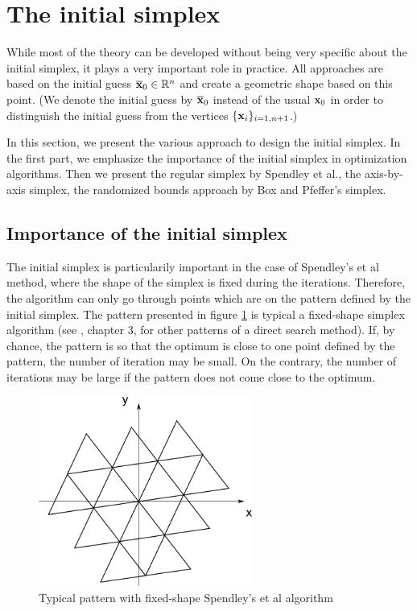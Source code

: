 \section{The initial simplex}

While most of the theory can be developed without being very specific 
about the initial simplex, it plays a very important role in practice.
All approaches are based on the initial guess $\overline{\mathbf{x}}_0\in\mathbb{R}^n$ and create a 
geometric shape based on this point.
(We denote the initial guess by $\overline{\mathbf{x}}_0$ instead of the usual $\mathbf{x}_0$
in order to distinguish the initial guess from the vertices $\{\mathbf{x}_i\}_{i=1,n+1}$.)


In this section, we present the various approach to design the initial 
simplex. In the first part, we emphasize the importance of the initial
simplex in optimization algorithms. Then we present the regular simplex 
by Spendley et al., the axis-by-axis simplex, the randomized bounds approach by Box and 
Pfeffer's simplex.

\subsection{Importance of the initial simplex}

The initial simplex is particularily important in the case of Spendley's et al 
method, where the shape of the simplex is fixed during the iterations.
Therefore, the algorithm can only go through points which are on the pattern
defined by the initial simplex. The pattern presented in figure \ref{fig-nm-simplex-fixedshape}
is typical a fixed-shape simplex algorithm (see \cite{Torczon89multi-directionalsearch}, chapter 3, 
for other patterns of a direct search method).
If, by chance, the pattern is so that the optimum is close to one point 
defined by the pattern, the number of iteration may be small. On the contrary, the 
number of iterations may be large if the pattern does not come close to the 
optimum.

\begin{figure}
\begin{center}
\includegraphics[width=7cm]{simplex_initialfixed.png}
\end{center}
\caption{Typical pattern with fixed-shape Spendley's et al algorithm}
\label{fig-nm-simplex-fixedshape}
\end{figure}

